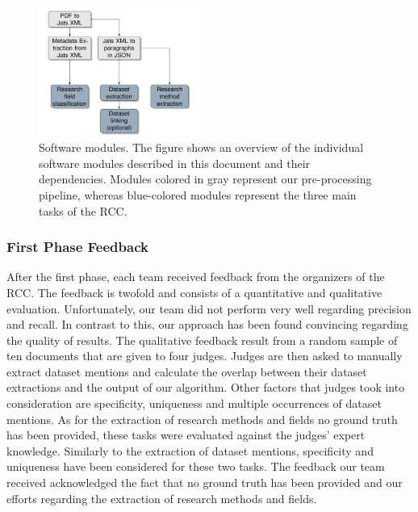 \begin{figure}[t]
    \includegraphics[width=0.47\textwidth]{figures/information-flow.png}
    \caption{Software modules. The figure shows an overview of the individual software modules described in this document and their dependencies. Modules colored in gray represent our pre-processing pipeline, whereas blue-colored modules represent the three main tasks of the RCC.}
    \label{figure:pipeline}
\end{figure}

\subsubsection{First Phase Feedback}
After the first phase, each team received feedback from the organizers of the RCC.
The feedback is twofold and consists of a quantitative and qualitative evaluation. Unfortunately, our team did not perform very well regarding precision and recall. In contrast to this, our approach has been found convincing regarding the quality of results. The qualitative feedback result from a random sample of ten documents that are given to four judges.
Judges are then asked to manually extract dataset mentions and calculate the overlap between their dataset extractions and the output of our algorithm.
Other factors that judges took into consideration are specificity, uniqueness and multiple occurrences of dataset mentions.
As for the extraction of research methods and fields no ground truth has been provided, these tasks were evaluated against the judges' expert knowledge.
Similarly to the extraction of dataset mentions, specificity and uniqueness have been considered for these two tasks.
The feedback our team received acknowledged the fact that no ground truth has been provided and our efforts regarding the extraction of research methods and fields.

